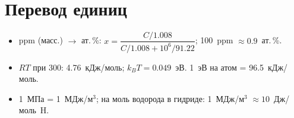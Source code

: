 \section*{Перевод единиц}
\begin{itemize}
\item ppm (масс.) $\to$ ат.\,\%: $x = \dfrac{C/1.008}{C/1.008 + 10^6/91.22}$; 100~ppm $\approx0.9$~ат.\,\%.
\item $RT$ при 300\degC: 4.76~кДж/моль; $k_BT = 0.049$~эВ. 1~эВ на атом = 96.5~кДж/моль.
\item 1~МПа = 1~МДж/м$^3$; на моль водорода в гидриде: 1~МДж/м$^3$ $\approx10$~Дж/моль~H.
\end{itemize}
